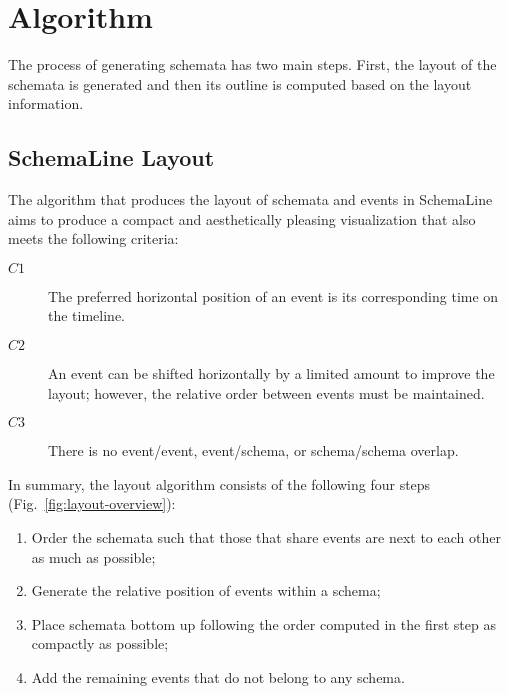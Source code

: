 \section{Algorithm}
\label{sec:layout}


The process of generating schemata has two main steps. First, the layout of the schemata is generated and then its outline is computed based on the layout information.
\subsection{SchemaLine Layout}
\label{sub:schema-layout}
The algorithm that produces the layout of schemata and events in SchemaLine aims to produce a compact and aesthetically pleasing visualization that also meets the following criteria: 
\begin{description}
	\item [$C1$] The preferred horizontal position of an event is its corresponding time on the timeline.
	\item [$C2$] An event can be shifted horizontally by a limited amount to improve the layout; however, the relative order between events must be maintained. 
	\item [$C3$] There is no event/event, event/schema, or schema/schema overlap.
\end{description}

In summary, the layout algorithm consists of the following four steps (Fig.~\ref{fig:layout-overview}):
\begin{enumerate} 
	\item Order the schemata such that those that share events are next to each other as much as possible;
	\item Generate the relative position of events within a schema;
	\item Place schemata bottom up following the order computed in the first step as compactly as possible;
	\item Add the remaining events that do not belong to any schema. 
\end{enumerate}

